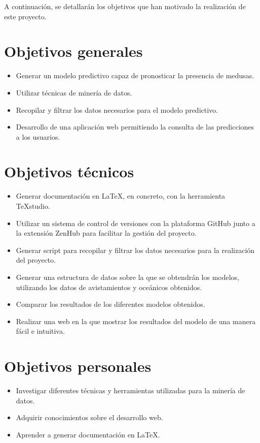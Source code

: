 

A continuación, se detallarán los objetivos que han motivado la realización de este proyecto.

\section{Objetivos generales}
\begin{itemize}
	
	\item Generar un modelo predictivo capaz de pronosticar la presencia de medusas.
	\item Utilizar técnicas de minería de datos.
	\item Recopilar y filtrar los datos necesarios para el modelo predictivo.
	\item Desarrollo de una aplicación web permitiendo la consulta de las predicciones a los usuarios.
\end{itemize}

\section{Objetivos técnicos}
\begin{itemize}
	\item Generar documentación en \LaTeX, en concreto, con la herramienta \TeX studio.
	\item Utilizar un sistema de control de versiones con la plataforma GitHub junto a la extensión ZenHub para facilitar la gestión del proyecto.
	\item Generar script para recopilar y filtrar los datos necesarios para la realización del proyecto.
	\item Generar una estructura de datos sobre la que se obtendrán los modelos, utilizando los datos de avistamientos y oceánicos obtenidos.
	\item Comparar los resultados de los diferentes modelos obtenidos.	
	\item Realizar una web en la que mostrar los resultados del modelo de una manera fácil e intuitiva.
\end{itemize}

\section{Objetivos personales}
\begin{itemize}
	\item Investigar diferentes técnicas y herramientas utilizadas para la minería de datos.
	\item Adquirir conocimientos sobre el desarrollo web.
	\item Aprender a generar documentación en \LaTeX.
	
\end{itemize}